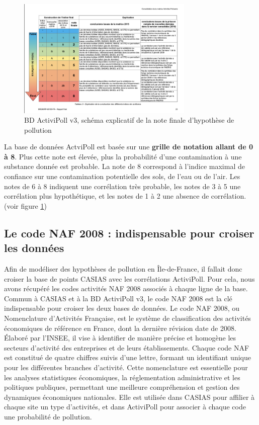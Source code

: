 \documentclass[a4paper,twoside,12pt]{book}
\begin{document}
\begin{figure}[!h]
\centering 
\includegraphics[width=0.75\textwidth]{img/chapitre3/BRGM_ActiviPol_Tableau}
\caption{BD ActiviPoll v3, schéma explicatif de la note finale d'hypothèse de pollution}
\label{fig.ActiviPoll_notation}
\end{figure}

La base de données ActviPoll est basée sur une \textbf{grille de notation allant de 0 à 8}. Plus cette note est élevée, plus la probabilité d'une contamination à une substance donnée est probable. La note de 8 correspond à l'indice maximal de confiance sur une contamination potentielle des sols, de l'eau ou de l'air. Les notes de 6 à 8 indiquent une corrélation très probable, les notes de 3 à 5 une corrélation plus hypothétique, et les notes de 1 à 2 une absence de corrélation. (voir figure \ref{fig.ActiviPoll_notation})

\subsection{Le code NAF 2008 : indispensable pour croiser les données}

Afin de modéliser des hypothèses de pollution en Île-de-France, il fallait donc croiser la base de points CASIAS avec les corrélations ActiviPoll. Pour cela, nous avons récupéré les codes activités NAF 2008 associés à chaque ligne de la base. Commun à CASIAS et à la BD ActiviPoll v3, le code NAF 2008 est la clé indispensable pour croiser les deux bases de données. Le code NAF 2008, ou Nomenclature d'Activités Française, est le système de classification des activités économiques de référence en France, dont la dernière révision date de 2008. Élaboré par l'INSEE, il vise à identifier de manière précise et homogène les secteurs d'activité des entreprises et de leurs établissements. Chaque code NAF est constitué de quatre chiffres suivis d'une lettre, formant un identifiant unique pour les différentes branches d'activité. Cette nomenclature est essentielle pour les analyses statistiques économiques, la réglementation administrative et les politiques publiques, permettant une meilleure compréhension et gestion des dynamiques économiques nationales. Elle est utilisée dans CASIAS pour affilier à chaque site un type d'activités, et dans ActiviPoll pour associer à chaque code une probabilité de pollution. 
\end{document}
